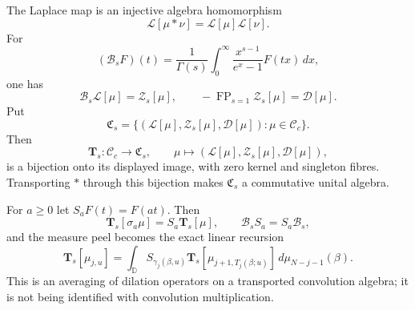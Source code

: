 \begin{theorem}
\label{thm:cueM-transform-algebra}
The Laplace map is an injective algebra homomorphism
\begin{equation}
 \mathcal L[\mu*\nu]=\mathcal L[\mu]\mathcal L[\nu].
 \label{eq:cueM-Laplace-product}
\end{equation}
For
\begin{equation}
 (\mathcal B_sF)(t)=\frac1{\Gamma(s)}
 \int_0^\infty\frac{x^{s-1}}{e^x-1}F(tx)\,dx,
 \label{eq:cueM-Bose-operator}
\end{equation}
one has
\begin{equation}
 \mathcal B_s\mathcal L[\mu]=\mathcal Z_s[\mu],
 \qquad
 -\operatorname{FP}_{s=1}\mathcal Z_s[\mu]=\mathcal D[\mu].
 \label{eq:cueM-Bose-Hurwitz-digamma}
\end{equation}
Put
\[
 \mathfrak C_s=\{(\mathcal L[\mu],\mathcal Z_s[\mu],\mathcal D[\mu]):
 \mu\in\mathcal C_c\}.
\]
Then
\begin{equation}
 \mathbf T_s:\mathcal C_c\longrightarrow
 \mathfrak C_s,\qquad
 \mu\longmapsto(\mathcal L[\mu],\mathcal Z_s[\mu],\mathcal D[\mu]),
 \label{eq:cueM-transform-triple}
\end{equation}
is a bijection onto its displayed image, with zero kernel and singleton fibres.  Transporting
$*$ through this bijection makes $\mathfrak C_s$ a commutative unital algebra.

For $a\geq0$ let $S_aF(t)=F(at)$.  Then
\begin{equation}
 \mathbf T_s[\sigma_a\mu]=S_a\mathbf T_s[\mu],
 \qquad
 \mathcal B_sS_a=S_a\mathcal B_s,
 \label{eq:cueM-dilation-commutation}
\end{equation}
and the measure peel becomes the exact linear recursion
\begin{equation}
 \mathbf T_s[\mu_{j,u}]=
 \int_{\mathbb D}S_{\gamma_j(\beta,u)}
 \mathbf T_s[\mu_{j+1,T_j(\beta;u)}]\,
 d\mu_{N-j-1}(\beta).
 \label{eq:cueM-transform-peel}
\end{equation}
This is an averaging of dilation operators on a transported convolution algebra; it is not
being identified with convolution multiplication.
\end{theorem}

